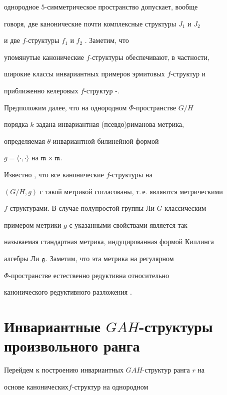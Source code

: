 однородное $5$-симметрическое пространство допускает, вообще


говоря, две канонические почти комплексные структуры $J_1$ и $J_2$


и две $f$-структуры $f_1$ и $f_2$ \cite{13}. Заметим, что


упомянутые канонические $f$-структуры обеспечивают, в частности,


широкие классы инвариантных примеров эрмитовых $f$-структур и


приближенно келеровых $f$-структур \cite{16}-\cite{18}.








Предположим далее, что на однородном $\Phi$-пространстве $G/H$


порядка $k$ задана инвариантная (псевдо)риманова метрика,


определяемая $\theta$-инвариантной билинейной формой


$g=\langle\cdot,\cdot \rangle$ на $\frak{m}\times\frak{m}$.


Известно \cite{28}, что все канонические $f$-структуры на


$(G/H,g)$ с такой метрикой согласованы, т.\,е. являются метрическими


$f$-структурами. В случае полупростой группы Ли $G$ классическим


примером метрики $g$ с указанными свойствами является так


называемая стандартная метрика, индуцированная формой Киллинга


алгебры Ли  $\frak{g}$. Заметим, что эта метрика на регулярном


$\Phi$-пространстве естественно редуктивна относительно


канонического редуктивного разложения \cite{25}.





\section{Инвариантные $GAH$-структуры произвольного ранга}





Перейдем к построению инвариантных $GAH$-структур ранга $r$ на


основе канонических\linebreak $f$-структур на однородном


